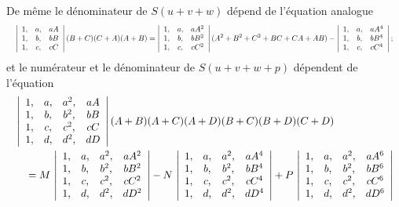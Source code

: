 \documentclass[11pt]{article}
\begin{document}
\noindent De m\^eme le d\'enominateur de $S(u + v + w)$ d\'epend de l'\'equation analogue
\[ \resizebox{\textwidth}{!}{$\displaystyle
\left|\begin{array}{ccc}1, & a, & aA\\ 1, & b, & bB\\ 1, & c, & cC\end{array}\right|(B + C)(C + A)(A + B) = \left|\begin{array}{ccc}1, & a, & aA^{2}\\ 1, & b, & bB^{2}\\ 1, & c, & cC^{2}\end{array}\right|(A^{2} + B^{2} + C^{2} + BC + CA + AB) - \left|\begin{array}{ccc}1, & a, & aA^{4}\\ 1, & b, & bB^{4}\\ 1, & c, & cC^{4}\end{array}\right|;
$} \]
et le num\'erateur et le d\'enominateur de $S(u + v + w + p)$ d\'ependent de l'\'equation
\[ \resizebox{\textwidth}{!}{$\displaystyle
\begin{aligned}
&\left|\begin{array}{cccc}1, & a, & a^{2}, & aA\\ 1, & b, & b^{2}, & bB\\ 1, & c, & c^{2}, & cC\\ 1, & d, & d^{2}, & dD\end{array}\right|(A + B)(A + C)(A + D)(B + C)(B + D)(C + D)\\
&\quad = M\,\left|\begin{array}{cccc}1, & a, & a^{2}, & aA^{2}\\ 1, & b, & b^{2}, & bB^{2}\\ 1, & c, & c^{2}, & cC^{2}\\ 1, & d, & d^{2}, & dD^{2}\end{array}\right| - N\,\left|\begin{array}{cccc}1, & a, & a^{2}, & aA^{4}\\ 1, & b, & b^{2}, & bB^{4}\\ 1, & c, & c^{2}, & cC^{4}\\ 1, & d, & d^{2}, & dD^{4}\end{array}\right| + P\,\left|\begin{array}{cccc}1, & a, & a^{2}, & aA^{6}\\ 1, & b, & b^{2}, & bB^{6}\\ 1, & c, & c^{2}, & cC^{6}\\ 1, & d, & d^{2}, & dD^{6}\end{array}\right|
\end{aligned}
$} \]
\end{document}
